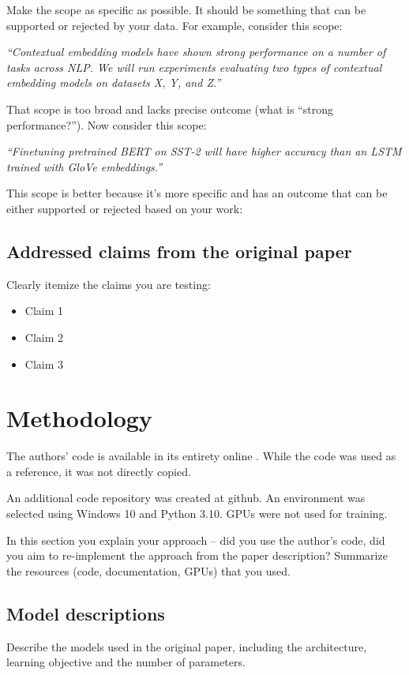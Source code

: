 \documentclass[11pt,a4paper]{article}
\begin{document}
Make the scope as specific as possible. It should be something that can be supported or rejected by your data. For example, consider this scope: 

\textit{``Contextual embedding models have shown strong performance on a number of tasks across NLP. We will run experiments evaluating two types of contextual embedding models on datasets X, Y, and Z.''}


That scope is too broad and lacks precise outcome (what is ``strong performance?''). Now consider this scope:

\textit{``Finetuning pretrained BERT on SST-2 will have higher accuracy than an LSTM trained with GloVe embeddings.''}

This scope is better because it's more specific and has an outcome that can be either supported or rejected based on your work: 
\subsection{Addressed claims from the original paper}

Clearly itemize the claims you are testing:
\begin{itemize}
    \item Claim 1
    \item Claim 2
    \item Claim 3
\end{itemize}


\section{Methodology}
The authors' code is available in its entirety online \citep{burger_2021_data}. While the code was used as a reference, it was not directly copied. 

An additional code repository was created at github. An environment was selected using Windows 10 and Python 3.10. GPUs were not used for training. 

In this section you explain your approach -- did you use the author's code, did you aim to re-implement the approach from the paper description? Summarize the resources (code, documentation, GPUs) that you used. 

\subsection{Model descriptions}
Describe the models used in the original paper, including the architecture, learning objective and the number of parameters.
\end{document}
